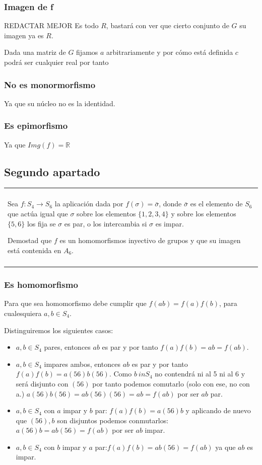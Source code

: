 \documentclass[12pt]{article}
\newenvironment{micaja}
{
    \begin{center}
    \begin{tabular}{|p{0.9\textwidth}|}
    \hline\\
    }   
    {   
    \\\\\hline
    \end{tabular} 
    \end{center}
    }
\begin{document}
\subsubsection*{Imagen de f}
REDACTAR MEJOR
Es todo $R$, bastará con ver que cierto conjunto de $G$
su imagen ya es $R.$

Dada una matriz de $G$ fijamos $a$ arbitrariamente
y por cómo está definida $c$ podrá ser cualquier real  por tanto 


\subsubsection*{No es monormorfismo}
Ya que su núcleo no es la identidad.

\subsubsection*{Es epimorfismo}
Ya que $Img(f) = \mathbb R$

\newpage
\subsection{Segundo apartado}

\begin{micaja}
    Sea $f:S_4 \rightarrow S_6$ la aplicación dada por
    $f(\sigma) = \bar \sigma$, donde $\bar \sigma$
    es el elemento de $S_6$ que actúa igual que $\sigma$
    sobre los elementos $\{1,2,3,4\}$ y sobre los elementos
    $\{5,6\}$ los fija se $\sigma$ es par, o los intercambia
    si $\sigma$ es impar.

    Demostad que $f$ es un homomorfismos 
    inyectivo de grupos y que su imagen está contenida en $A_6.$
\end{micaja}

\subsubsection*{Es homomorfismo}

Para que sea homomorfismo debe cumplir que $f(ab) = f(a)f(b)$, para cualesquiera $a,b \in S_4.$

Distinguiremos los siguientes casos: 

\begin{itemize}
    \item $a,b \in S_4$ pares, entonces $ab$ es par y por tanto $f(a)f(b)=ab = f(ab).$
    \item $a,b \in S_4$ impares ambos, entonces $ab$ es par y por tanto $f(a)f(b)=a(56)b(56).$
    Como $b \ in S_4$ no contendrá ni al 5 ni al 6 y será disjunto con $(56)$ por tanto podemos comutarlo
    (solo con ese, no con a.) $a(56)b(56) = ab(56)(56) = ab = f(ab)$ por ser $ab$ par.
    \item $a,b \in S_4$ con $a$ impar y $b$ par: $f(a)f(b) = a(56)b$ y aplicando de nuevo que $(56),b$ son
    disjuntos podemos conmutarlos:$a(56)b = ab(56) = f(ab)$ por ser $ab$ impar.
    \item $a,b \in S_4$ con $b$ impar y $a$ par:$f(a)f(b)= ab(56) = f(ab)$ ya que $ab$ es impar. 
\end{itemize}
\end{document}
